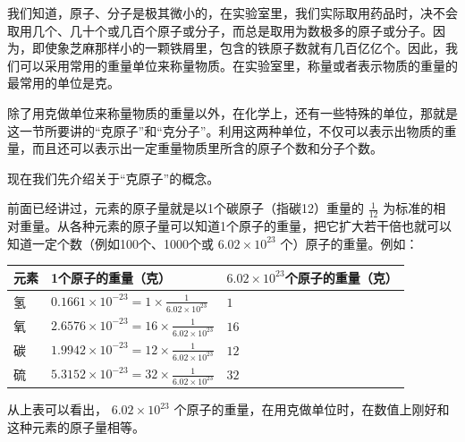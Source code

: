 我们知道，原子、分子是极其微小的，在实验室里，我们实际取用药品时，决不会取用几个、几十个或几百个原子或分子，而总是取用为数极多的原子或分子。因为，即使象芝麻那样小的一颗铁屑里，包含的铁原子数就有几百亿亿个。因此，我们可以采用常用的重量单位来称量物质。在实验室里，称量或者表示物质的重量的最常用的单位是克。

除了用克做单位来称量物质的重量以外，在化学上，还有一些特殊的单位，那就是这一节所要讲的``克原子''和``克分子''。利用这两种单位，不仅可以表示出物质的重量，而且还可以表示出一定重量物质里所含的原子个数和分子个数。

现在我们先介绍关于``克原子''的概念。

前面已经讲过，元素的原子量就是以1个碳原子（指碳12）重量的
\(\frac{1}{12}\)
为标准的相对重量。从各种元素的原子量可以知道1个原子的重量，把它扩大若干倍也就可以知道一定个数（例如100个、1000个或
\(6.02\times 10^{23}\) 个）原子的重量。例如：

{\def\LTcaptype{none} %
\begin{longtable}[]{@{}
  >{\raggedright\arraybackslash}p{}
  >{\raggedright\arraybackslash}p{}
  >{\raggedright\arraybackslash}p{}@{}}
\toprule\noalign{}
\begin{minipage}[b]{\linewidth}\raggedright
元素
\end{minipage} & \begin{minipage}[b]{\linewidth}\raggedright
1个原子的重量（克）
\end{minipage} & \begin{minipage}[b]{\linewidth}\raggedright
\(6.02\times10^{23}\)个原子的重量（克）
\end{minipage} \\
\midrule\noalign{}
\endhead
\bottomrule\noalign{}
\endlastfoot
氢 & \(0.1661\times10^{-23}=1\times\frac{1}{6.02\times10^{23}}\) &
\(1\) \\
氧 & \(2.6576\times10^{-23}=16\times\frac{1}{6.02\times10^{23}}\) &
\(16\) \\
碳 & \(1.9942\times10^{-23}=12\times\frac{1}{6.02\times10^{23}}\) &
\(12\) \\
硫 & \(5.3152\times10^{-23}=32\times\frac{1}{6.02\times10^{23}}\) &
\(32\) \\
\end{longtable}
}

从上表可以看出， \(6.02 \times 10^{23}\)
个原子的重量，在用克做单位时，在数值上刚好和这种元素的原子量相等。

